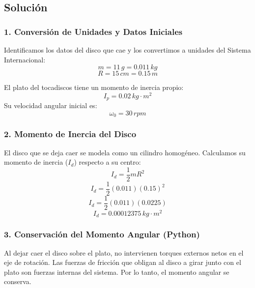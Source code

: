 \documentclass[12pt, a4paper]{article}
\begin{document}
\begin{center}
\end{center}

\subsection*{Solución}

\subsubsection*{1. Conversión de Unidades y Datos Iniciales}
Identificamos los datos del disco que cae y los convertimos a unidades del Sistema Internacional:
$$m = 11 \, \si{g} = 0.011 \, \si{kg}$$
$$R = 15 \, \si{cm} = 0.15 \, \si{m}$$

El plato del tocadiscos tiene un momento de inercia propio:
$$I_p = 0.02 \, \si{kg\cdot m^2}$$
Su velocidad angular inicial es:
$$\omega_0 = 30 \, \si{rpm}$$

\subsubsection*{2. Momento de Inercia del Disco}
El disco que se deja caer se modela como un cilindro homogéneo. Calculamos su momento de inercia ($I_d$) respecto a su centro:
$$I_d = \frac{1}{2} m R^2$$
$$I_d = \frac{1}{2} (0.011) (0.15)^2$$
$$I_d = \frac{1}{2} (0.011) (0.0225)$$
$$I_d = 0.00012375 \, \si{kg\cdot m^2}$$

\subsubsection*{3. Conservación del Momento Angular (Python)}
Al dejar caer el disco sobre el plato, no intervienen torques externos netos en el eje de rotación. Las fuerzas de fricción que obligan al disco a girar junto con el plato son fuerzas internas del sistema. Por lo tanto, el momento angular se conserva.
\end{document}
